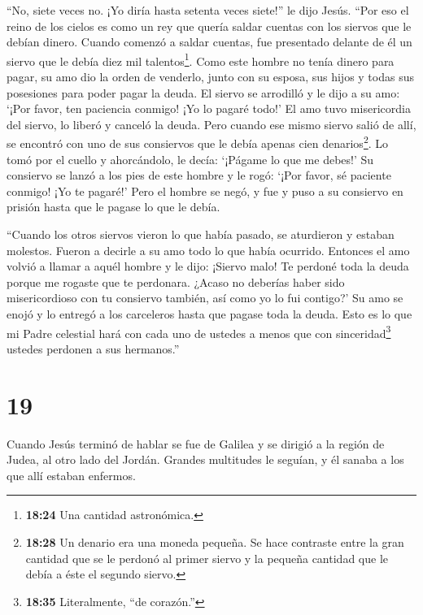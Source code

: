  ``No, siete veces no. ¡Yo diría hasta setenta veces
siete!'' le dijo Jesús.  ``Por eso el reino de los cielos
es como un rey que quería saldar cuentas con los siervos que le debían
dinero.  Cuando comenzó a saldar cuentas, fue presentado
delante de él un siervo que le debía diez mil talentos\footnote{\textbf{18:24}
  Una cantidad astronómica.}.  Como este hombre no tenía
dinero para pagar, su amo dio la orden de venderlo, junto con su esposa,
sus hijos y todas sus posesiones para poder pagar la deuda.
 El siervo se arrodilló y le dijo a su amo: `¡Por favor,
ten paciencia conmigo! ¡Yo lo pagaré todo!'  El amo tuvo
misericordia del siervo, lo liberó y canceló la deuda. 
Pero cuando ese mismo siervo salió de allí, se encontró con uno de sus
consiervos que le debía apenas cien denarios\footnote{\textbf{18:28} Un
  denario era una moneda pequeña. Se hace contraste entre la gran
  cantidad que se le perdonó al primer siervo y la pequeña cantidad que
  le debía a éste el segundo siervo.}. Lo tomó por el cuello y
ahorcándolo, le decía: `¡Págame lo que me debes!'  Su
consiervo se lanzó a los pies de este hombre y le rogó: `¡Por favor, sé
paciente conmigo! ¡Yo te pagaré!'  Pero el hombre se negó,
y fue y puso a su consiervo en prisión hasta que le pagase lo que le
debía.

 ``Cuando los otros siervos vieron lo que había pasado, se
aturdieron y estaban molestos. Fueron a decirle a su amo todo lo que
había ocurrido.  Entonces el amo volvió a llamar a aquél
hombre y le dijo: ¡Siervo malo! Te perdoné toda la deuda porque me
rogaste que te perdonara.  ¿Acaso no deberías haber sido
misericordioso con tu consiervo también, así como yo lo fui contigo?'
 Su amo se enojó y lo entregó a los carceleros hasta que
pagase toda la deuda.  Esto es lo que mi Padre celestial
hará con cada uno de ustedes a menos que con sinceridad\footnote{\textbf{18:35}
  Literalmente, ``de corazón.''} ustedes perdonen a sus hermanos.''

\hypertarget{section-18}{%
\section{19}\label{section-18}}

 Cuando Jesús terminó de hablar se fue de Galilea y se
dirigió a la región de Judea, al otro lado del Jordán. 
Grandes multitudes le seguían, y él sanaba a los que allí estaban
enfermos.

